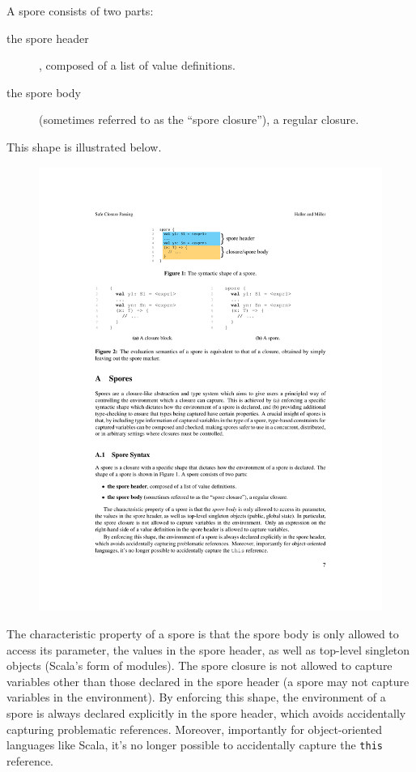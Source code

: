 \documentclass{jfp1}
\begin{document}
\vspace{3mm}
\noindent A spore consists of two parts:

\begin{description}
  \item[the spore header], composed of a list of value definitions.
  
  \item[the spore body] (sometimes referred to as the “spore closure”), a
    regular closure.
\end{description}

\noindent This shape is illustrated below.

\begin{figure}[h!]
\centering\includegraphics[width=0.75\columnwidth]{pic/spore-shape.pdf}
\end{figure}

The characteristic property of a spore is that the spore body is only allowed to
access its parameter, the values in the spore header, as well as top-level
singleton objects (Scala's form of modules). The spore closure is not allowed to
capture variables other than those declared in the spore header (\ie a spore may
not capture variables in the environment). By enforcing this shape, the
environment of a spore is always declared explicitly in the spore header, which
avoids accidentally capturing problematic references. Moreover, importantly for
object-oriented languages like Scala, it's no longer possible to accidentally
capture the \verb|this| reference.
\end{document}
